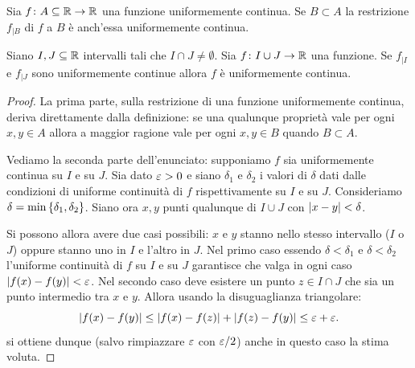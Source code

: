 \begin{theorem}
Sia $f\colon A \subseteq {\mathbb R} \to {\mathbb R}$ una funzione uniformemente continua. Se $B\subset A$ la restrizione $f_{|B}$ di $f$ a $B$ è anch'essa uniformemente continua.

Siano $I,J\subseteq {\mathbb R}$ intervalli tali che $I\cap J \neq \emptyset$.
Sia $f\colon I \cup J \to {\mathbb R}$ una funzione. Se $f_{|I}$ e $f_{|J}$ sono uniformemente continue allora $f$ è uniformemente continua.
\end{theorem}
\begin{proof}
La prima parte, sulla restrizione di una funzione uniformemente continua, deriva direttamente dalla definizione:
se una qualunque proprietà vale per ogni $x,y\in A$ allora a maggior ragione vale per ogni $x,y\in B$ quando $B\subset A$.

Vediamo la seconda parte dell'enunciato: supponiamo $f$ sia uniformemente continua su $I$ e su $J$.
Sia dato $\varepsilon>0$ e siano $\delta_1$ e $\delta_2$ i valori di $\delta$ dati dalle condizioni di uniforme continuità di $f$ rispettivamente su $I$ e su $J$. Consideriamo $\delta = \min{\left\{ \delta_1, \delta_2 \right\}}$.
Siano ora $x,y$ punti qualunque di $I\cup J$ con ${\left|x-y\right|}< \delta$.

Si possono allora avere due casi possibili:
$x$ e $y$ stanno nello stesso intervallo ($I$ o $J$) oppure stanno uno in $I$ e l'altro in $J$.
Nel primo caso essendo $\delta < \delta_1$ e $\delta< \delta_2$ l'uniforme continuità di $f$ su $I$ e su $J$ garantisce che valga in ogni caso ${\left|f(x)-f(y)\right|} < \varepsilon$. Nel secondo caso deve esistere un punto $z \in I\cap J$ che sia un punto intermedio tra $x$ e $y$.
Allora usando la disuguaglianza triangolare:
\[
  {\left|f(x) - f(y)\right|} \le {\left|f(x) - f(z)\right|} + {\left|f(z) - f(y)\right|}
     \le \varepsilon + \varepsilon.
\]
si ottiene dunque (salvo rimpiazzare $\varepsilon$ con $\varepsilon/2$) anche in
questo caso la stima voluta.
\end{proof}

